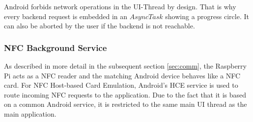 Android forbids network operations in the UI-Thread by design. That is why every backend request is embedded in an $AsyncTask$ showing a progress circle. It can also be aborted by the user if the backend is not reachable.

\subsubsection{NFC Background Service}
As described in more detail in the subsequent section \ref{sec:comm}, the Raspberry Pi acts as a NFC reader and the matching Android device behaves like a NFC card.
For NFC Host-based Card Emulation, Android's HCE service is used to route incoming NFC requests to the \app application.
Due to the fact that it is based on a common Android service, it is restricted to the same main UI thread as the main application.

